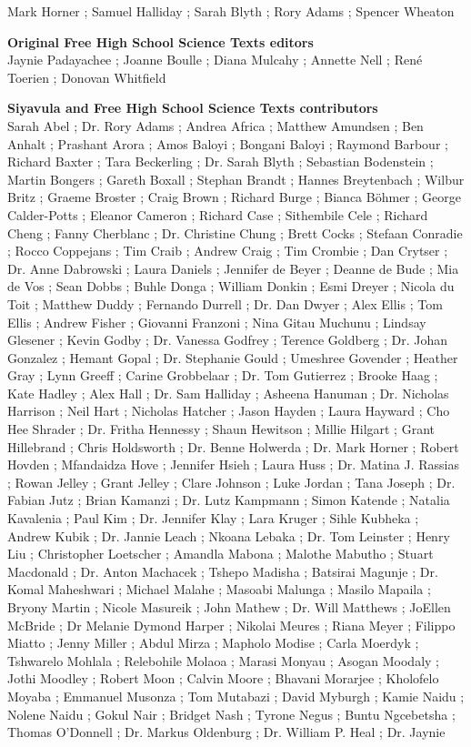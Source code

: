 Mark Horner ; Samuel Halliday ; Sarah Blyth ; Rory Adams ; Spencer Wheaton \par 


\textbf{\LARGE Original Free High School Science Texts editors}\\

Jaynie Padayachee ; Joanne Boulle ; Diana Mulcahy ; Annette Nell ; René Toerien ; Donovan Whitfield \par

\textbf{\LARGE Siyavula and Free High School Science Texts contributors}\\

Sarah Abel ; Dr. Rory Adams ; Andrea Africa ; Matthew Amundsen ; Ben Anhalt ; Prashant Arora ; Amos Baloyi ; Bongani Baloyi ; Raymond Barbour ; Richard Baxter ; Tara Beckerling ; Dr. Sarah Blyth ; Sebastian Bodenstein ; Martin Bongers ; Gareth Boxall ; Stephan Brandt ; Hannes Breytenbach ; Wilbur Britz ; Graeme Broster ; Craig Brown ; Richard Burge ; Bianca Böhmer ; George Calder-Potts ; Eleanor Cameron ; Richard Case ; Sithembile Cele ; Richard Cheng ; Fanny Cherblanc ; Dr. Christine Chung ; Brett Cocks ; Stefaan Conradie ; Rocco Coppejans ; Tim Craib ; Andrew Craig ; Tim Crombie ; Dan Crytser ; Dr. Anne Dabrowski ; Laura Daniels ; Jennifer de Beyer ; Deanne de Bude ; Mia de Vos ; Sean Dobbs ; Buhle Donga ; William Donkin ; Esmi Dreyer ; Nicola du Toit ; Matthew Duddy ; Fernando Durrell ; Dr. Dan Dwyer ; Alex Ellis ; Tom Ellis ; Andrew Fisher ; Giovanni Franzoni ; Nina Gitau Muchunu ; Lindsay Glesener ; Kevin Godby ; Dr. Vanessa Godfrey ; Terence Goldberg ; Dr. Johan Gonzalez ; Hemant Gopal ; Dr. Stephanie Gould ; Umeshree Govender ; Heather Gray ; Lynn Greeff ; Carine Grobbelaar ; Dr. Tom Gutierrez ; Brooke Haag ; Kate Hadley ; Alex Hall ; Dr. Sam Halliday ; Asheena Hanuman ; Dr. Nicholas Harrison ; Neil Hart ; Nicholas Hatcher ; Jason Hayden ; Laura Hayward ; Cho Hee Shrader ; Dr. Fritha Hennessy ; Shaun Hewitson ; Millie Hilgart ; Grant Hillebrand ; Chris Holdsworth ; Dr. Benne Holwerda ; Dr. Mark Horner ; Robert Hovden ; Mfandaidza Hove ; Jennifer Hsieh ; Laura Huss ; Dr. Matina J. Rassias ; Rowan Jelley ; Grant Jelley ; Clare Johnson ; Luke Jordan ; Tana Joseph ; Dr. Fabian Jutz ; Brian Kamanzi ; Dr. Lutz Kampmann ; Simon Katende ; Natalia Kavalenia ; Paul Kim ; Dr. Jennifer Klay ; Lara Kruger ; Sihle Kubheka ; Andrew Kubik ; Dr. Jannie Leach ; Nkoana Lebaka ; Dr. Tom Leinster ; Henry Liu ; Christopher Loetscher ; Amandla Mabona ; Malothe Mabutho ; Stuart Macdonald ; Dr. Anton Machacek ; Tshepo Madisha ; Batsirai Magunje ; Dr. Komal Maheshwari ; Michael Malahe ; Masoabi Malunga ; Masilo Mapaila ; Bryony Martin ; Nicole Masureik ; John Mathew ; Dr. Will Matthews ; JoEllen McBride ; Dr Melanie Dymond Harper ; Nikolai Meures ; Riana Meyer ; Filippo Miatto ; Jenny Miller ; Abdul Mirza ; Mapholo Modise ; Carla Moerdyk ; Tshwarelo Mohlala ; Relebohile Molaoa ; Marasi Monyau ; Asogan Moodaly ; Jothi Moodley ; Robert Moon ; Calvin Moore ; Bhavani Morarjee ; Kholofelo Moyaba ; Emmanuel Musonza ; Tom Mutabazi ; David Myburgh ; Kamie Naidu ; Nolene Naidu ; Gokul Nair ; Bridget Nash ; Tyrone Negus ; Buntu Ngcebetsha ; Thomas O’Donnell ; Dr. Markus Oldenburg ; Dr. William P. Heal ; Dr. Jaynie 